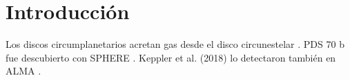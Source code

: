 \section{Introducción}
Los discos circumplanetarios acretan gas desde el disco circunestelar \citep{Real}.
PDS 70 b fue descubierto con SPHERE \citep[e.g.][]{Preprint}. Keppler et al. (2018) lo
detectaron también en ALMA \citet{NoExiste}.
